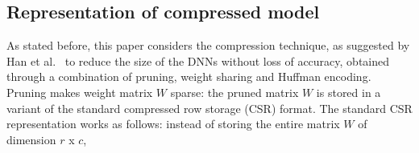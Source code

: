 
\subsection{Representation of compressed model}
As stated before,  this paper considers the compression technique, as suggested by  Han et  al.~\cite{HanMD15, HanPTD15}
to reduce the  size of the DNNs without loss of accuracy, obtained through a combination of pruning, weight sharing and Huffman encoding.
Pruning makes weight matrix $W$ sparse:
the pruned matrix $W$ is stored  in a variant of the standard compressed row storage (CSR) format.
The standard  CSR representation works as follows:
instead of storing the entire matrix $W$ of dimension $r$ x $c$,  
